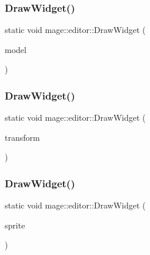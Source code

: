 \hypertarget{namespacemage_1_1editor_a3cc4349fe745bfbb06d4a662fc6c1437}{}\label{namespacemage_1_1editor_a3cc4349fe745bfbb06d4a662fc6c1437} 
\subsubsection{\texorpdfstring{Draw\+Widget()}{DrawWidget()}\hspace{0.1cm}{\footnotesize\ttfamily [15/20]}}
{\footnotesize\ttfamily static void mage\+::editor\+::\+Draw\+Widget (\begin{DoxyParamCaption}\item[{\hyperlink{classmage_1_1_model}{Model} \&}]{model }\end{DoxyParamCaption})\hspace{0.3cm}{\ttfamily [static]}}

\hypertarget{namespacemage_1_1editor_acfb55dbd52c9f41f778cdbce6c551bd3}{}\label{namespacemage_1_1editor_acfb55dbd52c9f41f778cdbce6c551bd3} 
\subsubsection{\texorpdfstring{Draw\+Widget()}{DrawWidget()}\hspace{0.1cm}{\footnotesize\ttfamily [16/20]}}
{\footnotesize\ttfamily static void mage\+::editor\+::\+Draw\+Widget (\begin{DoxyParamCaption}\item[{\hyperlink{classmage_1_1_sprite_transform}{Sprite\+Transform} \&}]{transform }\end{DoxyParamCaption})\hspace{0.3cm}{\ttfamily [static]}}

\hypertarget{namespacemage_1_1editor_ac52d7465a1b9bc40a1b446decc7bd4b3}{}\label{namespacemage_1_1editor_ac52d7465a1b9bc40a1b446decc7bd4b3} 
\subsubsection{\texorpdfstring{Draw\+Widget()}{DrawWidget()}\hspace{0.1cm}{\footnotesize\ttfamily [17/20]}}
{\footnotesize\ttfamily static void mage\+::editor\+::\+Draw\+Widget (\begin{DoxyParamCaption}\item[{\hyperlink{classmage_1_1_sprite_image}{Sprite\+Image} \&}]{sprite }\end{DoxyParamCaption})\hspace{0.3cm}{\ttfamily [static]}}

